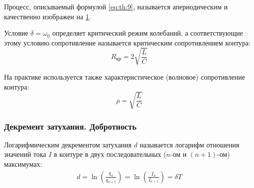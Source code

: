\begin{figure}[t]
	\centering
	\begin{minipage}{0.45\textwidth}
		\centering
		\caption{ }
		\label{fig:2}
	\end{minipage}
	\hfill
	\begin{minipage}{0.45\textwidth}
		\centering
		\caption{ }
		\label{fig:3}
	\end{minipage}
	
\end{figure}

Процесс, описываемый формулой \cref{eq:th:9}, называется апериодическим и качественно изображен на \cref{fig:3}.

Условие $\delta = \omega_0$ определяет критический режим колебаний, а соответствующие этому условию сопротивление называется критическим сопротивлением контура: \[R_\text{кр} = 2 \sqrt{\frac{L}{C}}\]

На практике используется также характеристическое (волновое) сопротивление контура:
\[\rho = \sqrt{\frac{L}{C}}\]

\subsubsection{Декремент затухания. Добротность}

Логарифмическим декрементом затухания $d$ называется логарифм отношения значений тока $I$ в контуре в двух последовательных ($n$-ом и $(n+1)$-ом) максимумах:
\begin{align} \label{eq:th:11}
	d = \ln \left(\frac{q_n}{q_{n+1}}\right) = \ln \left(\frac{I_n}{I_{n+1}}\right) = \delta T
\end{align}

